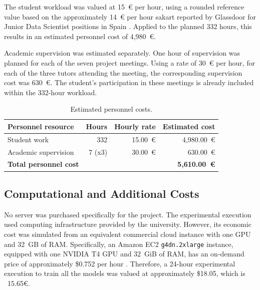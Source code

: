 The student workload was valued at 15~€ per hour, using a rounded reference value based on the approximately 14~€ per hour sakart reported by Glassdoor for Junior Data Scientist positions in Spain \cite{glassdoor_junior_data_scientist_salary}. Applied to the planned 332 hours, this results in an estimated personnel cost of 4,980~€.

Academic supervision was estimated separately. One hour of supervision was planned for each of the seven project meetings. Using a rate of 30~€ per hour, for each of the three tutors attending the meeting, the corresponding supervision cost was 630~€. The student's participation in these meetings is already included within the 332-hour workload.

\begin{table}[htbp]
    \centering
    \caption{Estimated personnel costs.}
    \label{tab:personnel_costs}
    \renewcommand{\arraystretch}{1.15}
    \begin{tabular}{lrrr}
        \toprule
        \textbf{Personnel resource}
        & \textbf{Hours}
        & \textbf{Hourly rate}
        & \textbf{Estimated cost} \\
        \midrule
        Student work
            & 332 & 15.00~€ & 4,980.00~€ \\

        Academic supervision
            & 7 (x3) & 30.00~€ & 630.00~€ \\
        \midrule
        \textbf{Total personnel cost}
            & & & \textbf{5,610.00~€} \\
        \bottomrule
    \end{tabular}
\end{table}

\subsection{Computational and Additional Costs}
\label{subsec:computational_costs}

No server was purchased specifically for the project. The experimental execution used computing infrastructure provided by the university. However, its economic cost was simulated from an equivalent commercial cloud instance with one GPU and 32~GB of RAM. Specifically, an Amazon EC2 \texttt{g4dn.2xlarge} instance, equipped with one NVIDIA T4 GPU and 32~GiB of RAM, has an on-demand price of approximately \$0.752 per hour \cite{vantage_g4dn_2xlarge}. Therefore, a 24-hour experimental execution to train all the models was valued at approximately \$18.05, which is ~15.65€.

